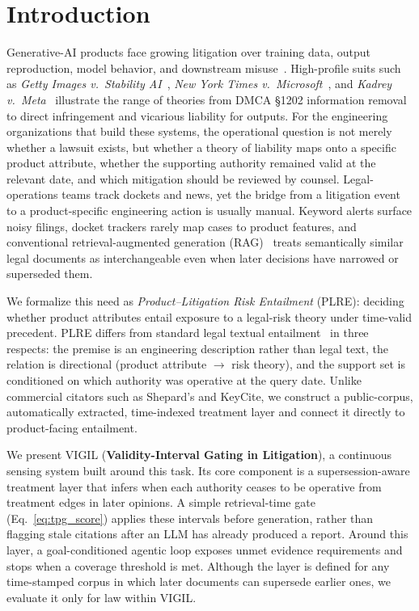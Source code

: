\section{Introduction}
\label{sec:introduction}

Generative-AI products face growing litigation over training data, output reproduction, model behavior, and downstream misuse~\citep{henderson2023foundation,levendowski2018copyright,grimmelmann2015copyright}. High-profile suits such as \emph{Getty Images v.\ Stability AI}~\citep{getty_stability_2023}, \emph{New York Times v.\ Microsoft}~\citep{nyt_openai_2023}, and \emph{Kadrey v.\ Meta}~\citep{kadrey_meta_2023} illustrate the range of theories from DMCA \S1202 information removal to direct infringement and vicarious liability for outputs. For the engineering organizations that build these systems, the operational question is not merely whether a lawsuit exists, but whether a theory of liability maps onto a specific product attribute, whether the supporting authority remained valid at the relevant date, and which mitigation should be reviewed by counsel. Legal-operations teams track dockets and news, yet the bridge from a litigation event to a product-specific engineering action is usually manual. Keyword alerts surface noisy filings, docket trackers rarely map cases to product features, and conventional retrieval-augmented generation (RAG)~\citep{lewis2020retrieval} treats semantically similar legal documents as interchangeable even when later decisions have narrowed or superseded them.

We formalize this need as \emph{Product--Litigation Risk Entailment} (PLRE): deciding whether product attributes entail exposure to a legal-risk theory under time-valid precedent. PLRE differs from standard legal textual entailment~\citep{rabelo2022coliee} in three respects: the premise is an engineering description rather than legal text, the relation is directional (product attribute $\rightarrow$ risk theory), and the support set is conditioned on which authority was operative at the query date. Unlike commercial citators such as Shepard's and KeyCite, we construct a public-corpus, automatically extracted, time-indexed treatment layer and connect it directly to product-facing entailment.

We present VIGIL (\textbf{Validity-Interval Gating in Litigation}), a continuous sensing system built around this task. Its core component is a supersession-aware treatment layer that infers when each authority ceases to be operative from treatment edges in later opinions. A simple retrieval-time gate (Eq.~\eqref{eq:tpg_score}) applies these intervals before generation, rather than flagging stale citations after an LLM has already produced a report. Around this layer, a goal-conditioned agentic loop exposes unmet evidence requirements and stops when a coverage threshold is met. Although the layer is defined for any time-stamped corpus in which later documents can supersede earlier ones, we evaluate it only for law within VIGIL.

